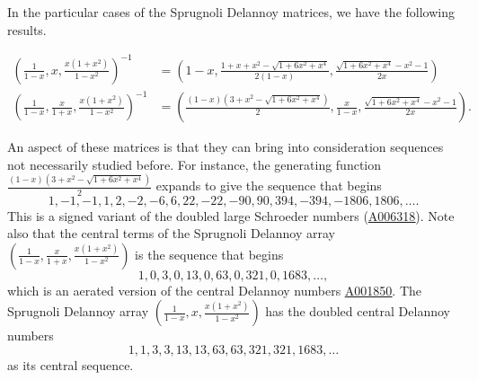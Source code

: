 \documentclass[12pt,reqno]{article}
\theoremstyle{definition}
\newcommand{\seqnum}[1]{\href{http://oeis.org/#1}{\underline{#1}}}
\begin{document}
In the particular cases of the Sprugnoli Delannoy matrices, we have the following results.
\begin{scriptsize}
\begin{align*}
\left(\frac{1}{1-x}, x, \frac{x(1+x^2)}{1-x^2}\right)^{-1}&=\left(1-x,\frac{1+x+x^2-\sqrt{1+6x^2+x^4}}{2(1-x)}, \frac{\sqrt{1+6x^2+x^4}-x^2-1}{2x}\right)\\
\left(\frac{1}{1-x}, \frac{x}{1+x}, \frac{x(1+x^2)}{1-x^2}\right)^{-1}&=\left(\frac{(1-x)(3+x^2-\sqrt{1+6x^2+x^4})}{2}, \frac{x}{1-x}, \frac{\sqrt{1+6x^2+x^4}-x^2-1}{2x}\right).\end{align*}
\end{scriptsize}
An aspect of these matrices is that they can bring into consideration sequences not necessarily studied before. For instance, the generating function $\frac{(1-x)(3+x^2-\sqrt{1+6x^2+x^4})}{2}$ expands to give the sequence that begins
$$1, -1, -1, 1, 2, -2, -6, 6, 22, -22, -90, 90, 394, -394, -1806, 1806, \ldots.$$ This is a signed variant of the doubled large Schroeder numbers (\seqnum{A006318}). Note also that the central terms of the Sprugnoli Delannoy array $\left(\frac{1}{1-x}, \frac{x}{1+x}, \frac{x(1+x^2)}{1-x^2}\right)$ is the sequence that begins
$$1, 0, 3, 0, 13, 0, 63, 0, 321, 0, 1683,\ldots,$$ which is an aerated version of the central Delannoy numbers \seqnum{A001850}. The Sprugnoli Delannoy array $\left(\frac{1}{1-x}, x, \frac{x(1+x^2)}{1-x^2}\right)$ has the doubled central Delannoy numbers
$$1, 1, 3, 3, 13, 13, 63, 63, 321, 321, 1683,\ldots$$ as its central sequence.
\end{document}
